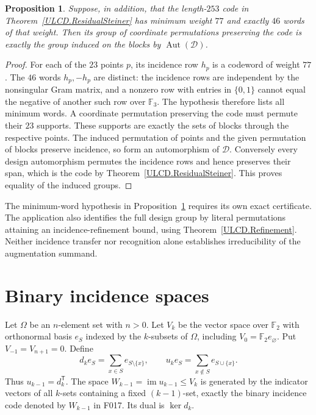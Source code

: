 \documentclass[11pt,a4paper]{article}
\newtheorem{proposition}[theorem]{Proposition}
\numberwithin{equation}{section}
\newcommand{\im}{\operatorname{im}}
\begin{document}
\begin{proposition}\label{ULCD.SteinerRecognition}
Suppose, in addition, that the length-$253$ code in
Theorem~\ref{ULCD.ResidualSteiner} has minimum weight $77$ and exactly $46$ words of
that weight. Then its group of coordinate permutations preserving the code
is exactly the group induced on the blocks by $\operatorname{Aut}(\mathcal D)$.
\end{proposition}
\begin{proof}
For each of the $23$ points $p$, its incidence row $h_p$ is a codeword of
weight $77$. The $46$ words $h_p,-h_p$ are distinct: the incidence rows
are independent by the nonsingular Gram matrix, and a nonzero row with
entries in $\{0,1\}$ cannot equal the negative of another such row over
$\mathbb F_3$. The hypothesis therefore lists all minimum words.
A coordinate permutation preserving the code must permute their $23$
supports. These supports are exactly the sets of blocks through the
respective points. The induced permutation of points and the given
permutation of blocks preserve incidence, so form an automorphism of
$\mathcal D$. Conversely every design automorphism permutes the incidence
rows and hence preserves their span, which is the code by
Theorem~\ref{ULCD.ResidualSteiner}. This proves equality of the induced groups.
\end{proof}

The minimum-word hypothesis in Proposition~\ref{ULCD.SteinerRecognition}
requires its own exact certificate. The application also identifies the
full design group by literal permutations attaining an incidence-refinement
bound, using Theorem~\ref{ULCD.Refinement}. Neither incidence transfer nor
recognition alone establishes irreducibility of the augmentation summand.

\section{Binary incidence spaces}

Let $\Omega$ be an $n$-element set with $n>0$. Let $V_k$ be the vector space over
$\mathbb F_2$ with orthonormal basis $e_S$ indexed by the $k$-subsets of
$\Omega$, including $V_0=\mathbb F_2e_\varnothing$. Put $V_{-1}=V_{n+1}=0$.
Define
\[
 d_k e_S=\sum_{x\in S}e_{S\setminus\{x\}},\qquad
 u_k e_S=\sum_{x\notin S}e_{S\cup\{x\}}.
\]
Thus $u_{k-1}=d_k^{\mathsf T}$. The space
$W_{k-1}=\im u_{k-1}\leq V_k$ is generated by the indicator vectors of
all $k$-sets containing a fixed $(k-1)$-set, exactly the binary incidence
code denoted by $W_{k-1}$ in F017. Its dual is $\ker d_k$.
\end{document}
